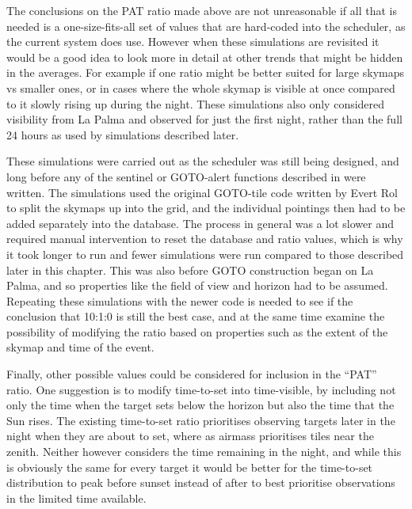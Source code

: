 \begin{colsection}
\begin{colsection}
The conclusions on the PAT ratio made above are not unreasonable if all that is needed is a one-size-fits-all set of values that are hard-coded into the scheduler, as the current system does use. However when these simulations are revisited it would be a good idea to look more in detail at other trends that might be hidden in the averages. For example if one ratio might be better suited for large skymaps vs smaller ones, or in cases where the whole skymap is visible at once compared to it slowly rising up during the night. These simulations also only considered visibility from La Palma and observed for just the first night, rather than the full 24 hours as used by simulations described later.

These simulations were carried out as the scheduler was still being designed, and long before any of the sentinel or GOTO-alert functions described in  were written. The simulations used the original GOTO-tile code written by Evert Rol to split the skymaps up into the grid, and the individual pointings then had to be added separately into the database. The process in general was a lot slower and required manual intervention to reset the database and ratio values, which is why it took longer to run and fewer simulations were run compared to those described later in this chapter. This was also before GOTO construction began on La Palma, and so properties like the field of view and horizon had to be assumed. Repeating these simulations with the newer code is needed to see if the conclusion that 10:1:0 is still the best case, and at the same time examine the possibility of modifying the ratio based on properties such as the extent of the skymap and time of the event.

Finally, other possible values could be considered for inclusion in the ``PAT'' ratio. One suggestion is to modify time-to-set into time-visible, by including not only the time when the target sets below the horizon but also the time that the Sun rises. The existing time-to-set ratio prioritises observing targets later in the night when they are about to set, where as airmass prioritises tiles near the zenith. Neither however considers the time remaining in the night, and while this is obviously the same for every target it would be better for the time-to-set distribution to peak before sunset instead of after to best prioritise observations in the limited time available.

\end{colsection}


\end{colsection}

